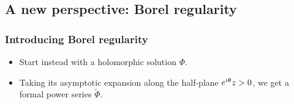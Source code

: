\documentclass{article}
\let\Re\relax
\DeclareMathOperator{\Re}{Re}
\theoremstyle{definition}
\newcommand{\series}[1]{\tilde{#1}}
\begin{document}
\subsection{A new perspective: Borel regularity}
\subsubsection{Introducing Borel regularity}
\begin{itemize}
\item Start instead with a holomorphic solution $\Phi$.
\item Taking its asymptotic expansion along the half-plane $\Re e^{i\theta}z > 0$, we get a formal power series $\series{\Phi}$.
\end{itemize}
\end{document}
